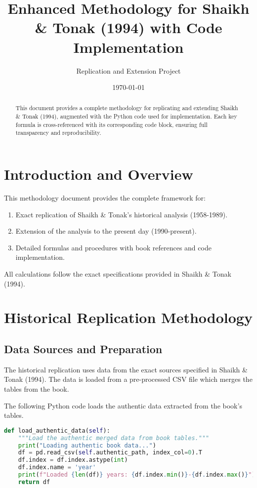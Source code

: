 \documentclass[12pt,a4paper]{article}
\title{Enhanced Methodology for Shaikh \& Tonak (1994) with Code Implementation}
\author{Replication and Extension Project}
\date{\today}
\begin{document}
\maketitle

\begin{abstract}
This document provides a complete methodology for replicating and extending Shaikh \& Tonak (1994), augmented with the Python code used for implementation. Each key formula is cross-referenced with its corresponding code block, ensuring full transparency and reproducibility.
\end{abstract}

\tableofcontents
\newpage

\section{Introduction and Overview}

This methodology document provides the complete framework for:
\begin{enumerate}
    \item Exact replication of Shaikh \& Tonak's historical analysis (1958-1989).
    \item Extension of the analysis to the present day (1990-present).
    \item Detailed formulas and procedures with book references and code implementation.
\end{enumerate}

All calculations follow the exact specifications provided in Shaikh \& Tonak (1994).

\section{Historical Replication Methodology}

\subsection{Data Sources and Preparation}
The historical replication uses data from the exact sources specified in Shaikh \& Tonak (1994). The data is loaded from a pre-processed CSV file which merges the tables from the book.

\begin{tcolorbox}[colback=blue!5!white,colframe=blue!75!black,title=Data Loading Implementation]
The following Python code loads the authentic data extracted from the book's tables.
\begin{lstlisting}[language=Python, caption=Data Loading, label=code:data_loading]
def load_authentic_data(self):
    """Load the authentic merged data from book tables."""
    print("Loading authentic book data...")
    df = pd.read_csv(self.authentic_path, index_col=0).T
    df.index = df.index.astype(int)
    df.index.name = 'year'
    print(f"Loaded {len(df)} years: {df.index.min()}-{df.index.max()}")
    return df
\end{lstlisting}
\end{tcolorbox}
\end{document}
